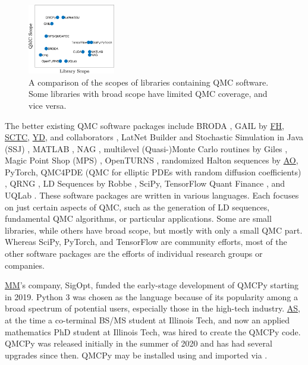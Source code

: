 \documentclass[11pt]{NSFamsart}
\newcommand{\FH}{\hyperlink{FHlink}{FH}\xspace}
\newcommand{\SCTC}{\hyperlink{SCTClink}{SCTC}\xspace}
\newcommand{\AO}{\hyperlink{AOlink}{AO}\xspace}
\newcommand{\MM}{\hyperlink{MMlink}{MM}\xspace}
\newcommand{\YD}{\hyperlink{YDlink}{YD}\xspace}
\newcommand{\AS}{\hyperlink{ASlink}{AS}\xspace}
\newcommand{\SciPy}{SciPy\xspace}
\newcommand{\TensorFlow}{TensorFlow\xspace}
\newcommand{\PyTorch}{PyTorch\xspace}
\begin{document}
\begin{figure}
	\includegraphics[width = 0.34\textwidth]{ProgramsImages/QMCSoftwarePlot.eps}
	\caption{A comparison of the scopes of libraries containing QMC software.  Some libraries with broad scope have limited QMC coverage, and vice versa.}
	\vspace{-0.3cm}
\end{figure}

\sloppypar The better existing QMC software packages include
BRODA \cite{BRODA20a}, GAIL by \FH, \SCTC, \YD, and collaborators \cite{ChoEtal21a}, LatNet Builder \cite{LatNet} and Stochastic Simulation in Java (SSJ) \cite{SSJ}, MATLAB \cite{MAT9.10}, NAG \cite{NAG27}, multilevel (Quasi-)Monte Carlo routines  by Giles \cite{GilesSoft}, Magic Point Shop (MPS) \cite{Nuy17a}, OpenTURNS \cite{OpenTURNS}, randomized Halton sequences by \AO \cite{Owe20a}, \PyTorch \cite{paszke2019pytorch}, QMC4PDE (QMC for elliptic PDEs with random diffusion coefficients) \cite{KuoNuy16a}, QRNG \cite{QRNG2020}, LD Sequences by Robbe \cite{Rob20a}, \SciPy \cite{virtanen2020scipy},  \TensorFlow Quant Finance \cite{tfqf2021a}, and
UQLab \cite{UQLab2014}.  These software packages are written in various languages.  
Each focuses on just certain aspects of QMC, such as the generation of LD sequences, fundamental QMC algorithms, or particular applications.  Some are small libraries, while others have broad scope, but mostly with only a small QMC part.  Whereas \SciPy, \PyTorch, and \TensorFlow are community efforts, most of the other software packages are the efforts of individual research groups or companies.

\MM's company, SigOpt, funded the early-stage development of  QMCPy starting in 2019. Python 3 was chosen as the language because of its popularity among a broad spectrum of potential users, especially those in the high-tech industry.  \AS,  at the time a co-terminal BS/MS student at Illinois Tech, and now an applied mathematics PhD student at Illinois Tech, was hired to create the QMCPy code.  QMCPy was released initially in the summer of 2020 and has had several upgrades since then.  QMCPy may be installed using  and imported via .
\end{document}
